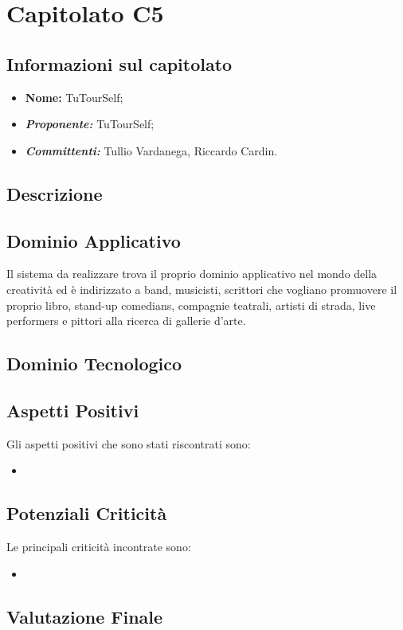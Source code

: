 \section{Capitolato C5}
\subsection{Informazioni sul capitolato}
	\begin{itemize}
		\item \textbf{Nome:}
		TuTourSelf;
		\item \textbf{\textit{Proponente:}}
		TuTourSelf;
		\item \textbf{\textit{Committenti:}}
		Tullio Vardanega, Riccardo Cardin.
	\end{itemize}

\subsection{Descrizione}
	
	
\subsection{Dominio Applicativo}
	Il sistema da realizzare trova il proprio dominio applicativo nel mondo della creatività ed è indirizzato a band, musicisti, scrittori che vogliano promuovere
	il proprio libro, stand-up comedians, compagnie teatrali, artisti di strada, live
	performers e pittori alla ricerca di gallerie d’arte.

\subsection{Dominio Tecnologico}

\subsection{Aspetti Positivi}
	Gli aspetti positivi che sono stati riscontrati sono:
	\begin{itemize}
		\item 
	\end{itemize}

\subsection{Potenziali Criticità}
	Le principali criticità incontrate sono:
	\begin{itemize}
		\item 
	\end{itemize}

\subsection{Valutazione Finale}
	